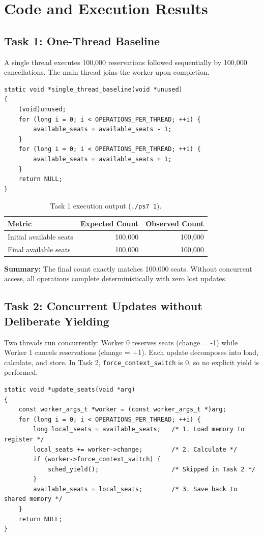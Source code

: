 \documentclass[a4paper,10pt]{article}
\begin{document}
\section{Code and Execution Results}

\subsection{Task 1: One-Thread Baseline}
A single thread executes 100,000 reservations followed sequentially by 100,000 cancellations. The main thread joins the worker upon completion.

\begin{lstlisting}[caption={Task 1: Sequential baseline implementation in \texttt{ps7.c}}]
static void *single_thread_baseline(void *unused)
{
    (void)unused;
    for (long i = 0; i < OPERATIONS_PER_THREAD; ++i) {
        available_seats = available_seats - 1;
    }
    for (long i = 0; i < OPERATIONS_PER_THREAD; ++i) {
        available_seats = available_seats + 1;
    }
    return NULL;
}
\end{lstlisting}

\begin{table}[H]
\centering
\footnotesize
\caption{Task 1 execution output (\texttt{./ps7 1}).}
\begin{tabular}{lrr}
\toprule
Metric & Expected Count & Observed Count \\
\midrule
Initial available seats & 100,000 & 100,000 \\
Final available seats   & 100,000 & 100,000 \\
\bottomrule
\end{tabular}
\end{table}
\noindent\textbf{Summary:} The final count exactly matches 100,000 seats. Without concurrent access, all operations complete deterministically with zero lost updates.

\clearpage

\subsection{Task 2: Concurrent Updates without Deliberate Yielding}
Two threads run concurrently: Worker 0 reserves seats (change = -1) while Worker 1 cancels reservations (change = +1). Each update decomposes into load, calculate, and store. In Task 2, \texttt{force\_context\_switch} is 0, so no explicit yield is performed.

\begin{lstlisting}[caption={Task 2: Worker routine decomposed into load, calculate, and store}]
static void *update_seats(void *arg)
{
    const worker_args_t *worker = (const worker_args_t *)arg;
    for (long i = 0; i < OPERATIONS_PER_THREAD; ++i) {
        long local_seats = available_seats;   /* 1. Load memory to register */
        local_seats += worker->change;        /* 2. Calculate */
        if (worker->force_context_switch) {
            sched_yield();                    /* Skipped in Task 2 */
        }
        available_seats = local_seats;        /* 3. Save back to shared memory */
    }
    return NULL;
}
\end{lstlisting}
\end{document}
